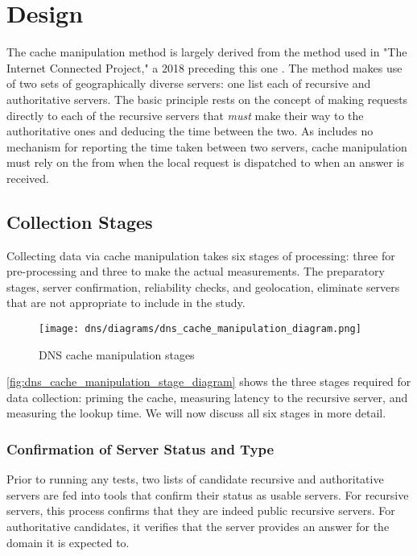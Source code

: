 \section{Design}\label{sec:dns_design}
The \dns cache manipulation method is largely derived from the method used in "The Internet Connected Project," a 2018 \mqp preceding this one \cite{Fakult2019}. The method makes use of two sets of geographically diverse \dns servers: one list each of recursive and authoritative servers. The basic principle rests on the concept of making requests directly to each of the recursive servers that \textit{must} make their way to the authoritative ones and deducing the time between the two. As \dns includes no mechanism for reporting the time taken between two servers, \dns cache manipulation must rely on the \rtt from when the local request is dispatched to when an answer is received.

\subsection{Collection Stages}\label{sec:dns_design_collection_stages}

Collecting data via \dns cache manipulation takes six stages of processing: three for pre-processing and three to make the actual measurements. The preparatory stages, server confirmation, reliability checks, and geolocation, eliminate servers that are not appropriate to include in the study.

\begin{figure}[htb]
    \centering
    \texttt{[image: dns/diagrams/dns\_cache\_manipulation\_diagram.png]}
    \caption{DNS cache manipulation stages}
    \label{fig:dns_cache_manipulation_stage_diagram}
\end{figure}

\autoref{fig:dns_cache_manipulation_stage_diagram} shows the three stages required for data collection: priming the \dns cache, measuring latency to the recursive \dns server, and measuring the lookup time. We will now discuss all six stages in more detail.

\subsubsection{Confirmation of Server Status and Type}\label{sec:dns_des_server_conf}
Prior to running any tests, two lists of candidate recursive and authoritative servers are fed into tools that confirm their status as usable servers. For recursive servers, this process confirms that they are indeed public recursive servers. For authoritative candidates, it verifies that the server provides an answer for the domain it is expected to.

